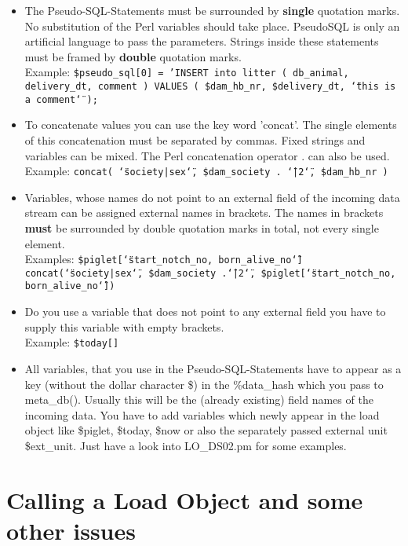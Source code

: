 \begin{itemize}
\item The Pseudo-SQL-Statements must be surrounded by \textbf{single} quotation
marks. No substitution of the Perl variables should take place. PseudoSQL
is only an artificial language to pass the parameters. Strings inside
these statements must be framed by \textbf{double} quotation marks.
\\
Example: \texttt{\small \$pseudo\_sql{[}0{]} = 'INSERT into litter
( db\_animal, delivery\_dt, comment ) VALUES ( \$dam\_hb\_nr, \$delivery\_dt,
\char`\"{}this is a comment\char`\"{} );} 
\item To concatenate values you can use the key word 'concat'. The single
elements of this concatenation must be separated by commas. Fixed
strings and variables can be mixed. The Perl concatenation operator
. can also be used. \\
Example: \texttt{\small concat( \char`\"{}society|sex\char`\"{}, \$dam\_society
. \char`\"{}|2\char`\"{}, \$dam\_hb\_nr )}{\small \par}
\item Variables, whose names do not point to an external field of the incoming
data stream can be assigned external names in brackets. The names
in brackets \textbf{must} be surrounded by double quotation marks
in total, not every single element. \\
Examples: \texttt{\small \$piglet{[}\char`\"{}start\_notch\_no, born\_alive\_no\char`\"{}{]}
concat(\char`\"{}society|sex\char`\"{}, \$dam\_society .\char`\"{}|2\char`\"{},
\$piglet{[}\char`\"{}start\_notch\_no, born\_alive\_no\char`\"{}{]})} 
\item Do you use a variable that does not point to any external field you
have to supply this variable with empty brackets. \\
Example: \texttt{\small \$today{[}{]}}{\small \par}
\item All variables, that you use in the Pseudo-SQL-Statements have to appear
as a key (without the dollar character \$) in the \%data\_hash which
you pass to meta\_db(). Usually this will be the (already existing)
field names of the incoming data. You have to add variables which
newly appear in the load object like \$piglet, \$today, \$now or also
the separately passed external unit \$ext\_unit. Just have a look
into LO\_DS02.pm for some examples.
\end{itemize}

\section{Calling a Load Object and some other issues}

